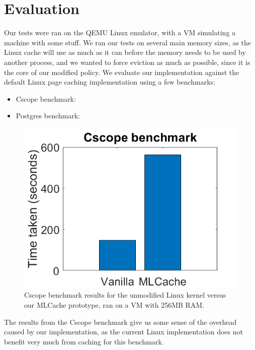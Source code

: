 \section{Evaluation}

Our tests were ran on the QEMU Linux emulator, with a VM simulating a machine with some stuff. We ran our tests on several main memory sizes, as the Linux cache will use as much as it can before the memory needs to be used by another process, and we wanted to force eviction as much as possible, since it is the core of our modified policy. We evaluate our implementation against the default Linux page caching implementation using a few benchmarks:

\begin{itemize}
	\item Cscope benchmark: 
	\item Postgres benchmark:
\end{itemize}


\label{fig:cscope}
\begin{figure}[h]
	\includegraphics[scale=0.4]{img/cscope_results_bigger.png}
	\caption{Cscope benchmark results for the unmodified Linux kernel versus our MLCache prototype, ran on a VM with 256MB RAM.}
\end{figure}


The results from the Cscope benchmark give us some sense of the overhead caused by our implementation, as the current Linux implementation does not benefit very much from caching for this benchmark. 

\label{fig:pg}



